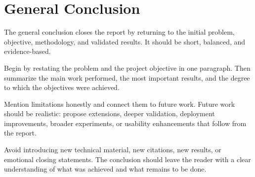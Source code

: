 \chapter*{General Conclusion}
{}
\label{chap:general-conclusion}

The general conclusion closes the report by returning to the initial problem, objective, methodology, and validated results. It should be short, balanced, and evidence-based.

Begin by restating the problem and the project objective in one paragraph. Then summarize the main work performed, the most important results, and the degree to which the objectives were achieved.

Mention limitations honestly and connect them to future work. Future work should be realistic: propose extensions, deeper validation, deployment improvements, broader experiments, or usability enhancements that follow from the report.

Avoid introducing new technical material, new citations, new results, or emotional closing statements. The conclusion should leave the reader with a clear understanding of what was achieved and what remains to be done.